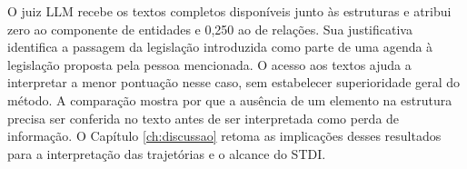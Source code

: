 O juiz LLM recebe os textos completos disponíveis junto às estruturas e atribui zero ao componente de entidades e 0,250 ao de relações. Sua justificativa identifica a passagem da legislação introduzida como parte de uma agenda à legislação proposta pela pessoa mencionada. O acesso aos textos ajuda a interpretar a menor pontuação nesse caso, sem estabelecer superioridade geral do método. A comparação mostra por que a ausência de um elemento na estrutura precisa ser conferida no texto antes de ser interpretada como perda de informação. O Capítulo \ref{ch:discussao} retoma as implicações desses resultados para a interpretação das trajetórias e o alcance do STDI.
